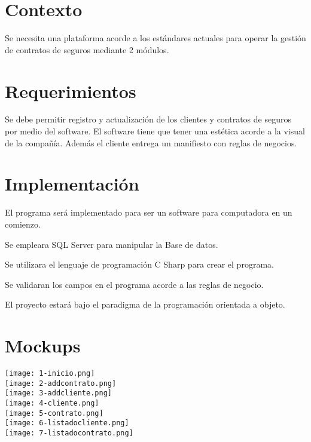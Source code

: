 \documentclass[letterpaper]{article}
\begin{document}
\section{Contexto}
Se necesita una plataforma acorde a los estándares actuales para operar la gestión de contratos de seguros mediante 2 módulos.

\section{Requerimientos}
Se debe permitir registro y actualización de los clientes y contratos de seguros por medio del software.
El software tiene que tener una estética acorde a la visual de la compañía.
Además el cliente entrega un manifiesto con reglas de negocios.

\section{Implementación}
El programa será implementado para ser un software para computadora en un comienzo.

Se empleara SQL Server para manipular la Base de datos.

Se utilizara el lenguaje de programación C Sharp para crear el programa.

Se validaran los campos en el programa  acorde a las reglas de negocio.

El proyecto estará bajo el paradigma de la programación orientada a objeto.


\section{Mockups}
\texttt{[image: 1-inicio.png]}\\[1.0 cm]
\texttt{[image: 2-addcontrato.png]}\\[1.0 cm]
\texttt{[image: 3-addcliente.png]}\\[1.0 cm]
\texttt{[image: 4-cliente.png]}\\[1.0 cm]
\texttt{[image: 5-contrato.png]}\\[1.0 cm]
\texttt{[image: 6-listadocliente.png]}\\[1.0 cm]
\texttt{[image: 7-listadocontrato.png]}\\[1.0 cm]
\end{document}
